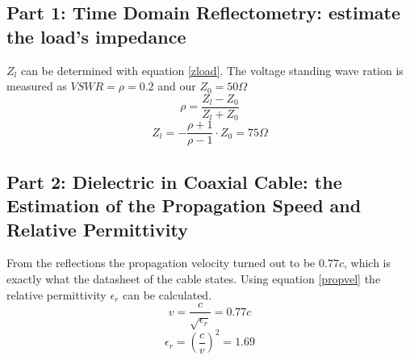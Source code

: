 \documentclass{article}
\begin{document}
		\subsection*{Part 1: Time Domain Reflectometry: estimate the load’s impedance}
			$Z_l$ can be determined with equation \ref{zload}. The voltage standing wave ration is measured as $VSWR = \rho = 0.2$ and our $Z_0 = 50 \Omega$
			\begin{equation}
			\label{zload}
				\rho = \frac{Z_l-Z_0}{Z_l+Z_0}
			\end{equation}
			\begin{equation}
				Z_l = - \frac{\rho + 1}{\rho - 1} \cdot Z_0 = 75 \Omega
			\end{equation}
	
		\subsection*{Part 2:  Dielectric in Coaxial Cable: the Estimation of the Propagation Speed and Relative Permittivity}
			From the reflections the propagation velocity turned out to be $0.77c$, which is exactly what the datasheet of the cable states\cite{datasheetcable}. 
			Using equation \ref{propvel} the relative permittivity $\epsilon_r$ can be calculated.
			\begin{equation}
			\label{propvel}
				v = \frac{c}{\sqrt{\epsilon_r}} = 0.77 c
			\end{equation}
			\begin{equation}
				\epsilon_r = (\frac{c}{v})^2 = 1.69
			\end{equation}


	\clearpage
	
	
\end{document}
